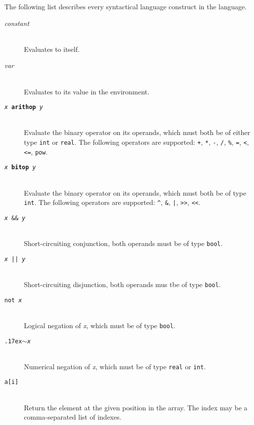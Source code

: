 \documentclass[oneside]{memoir}
\newcommand\boolt[0]{\texttt{bool}}
\newcommand\realt[0]{\texttt{real}}
\newcommand\intt[0]{\texttt{int}}
\renewcommand\tilde[0]{{\raise.17ex\hbox{$\scriptstyle\sim$}}}
\begin{document}
The following list describes every syntactical language construct in
the language.

\begin{description}
  \item[\textit{constant}]\hfill\\
    Evaluates to itself.

  \item[\textit{var}]\hfill\\
    Evaluates to its value in the environment.

  \item[\texttt{\textit{x} \textbf{arithop} \textit{y}}] \hfill\\
    Evaluate the binary operator on its operands, which must both be
    of either type \intt{} or \realt.  The following operators are
    supported: \texttt{+}, \texttt{*}, \texttt{-}, \texttt{/},
    \texttt{\%}, \texttt{=}, \texttt{<}, \texttt{<=}, \texttt{pow}.

  \item[\texttt{\textit{x} \textbf{bitop} \textit{y}}] \hfill\\
    Evaluate the binary operator on its operands, which must both be
    of type \intt.  The following operators are supported:
    \texttt{\^}, \texttt{\&}, \texttt{|}, \texttt{>>}, \texttt{<<}.

  \item[\texttt{\textit{x} \&\& \textit{y}}]\hfill\\
    Short-circuiting conjunction, both operands must be of type \boolt.

  \item[\texttt{\textit{x} || \textit{y}}]\hfill\\
    Short-circuiting disjunction, both operands mus tbe of type \boolt.

  \item[\texttt{not \textit{x}}]\hfill\\
    Logical negation of \textit{x}, which must be of type \boolt.

  \item[\texttt{\tilde \textit{x}}]\hfill\\
    Numerical negation of \textit{x}, which must be of type \realt{} or \intt.

  \item[\texttt{a[i]}]\hfill\\
    Return the element at the given position in the array.  The index
    may be a comma-separated list of indexes.


\end{description}
\end{document}
